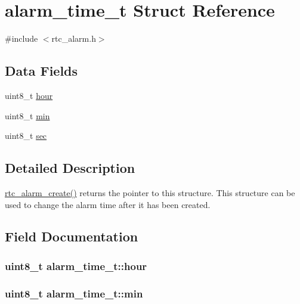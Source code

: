 \hypertarget{structalarm__time__t}{}\section{alarm\+\_\+time\+\_\+t Struct Reference}
\label{structalarm__time__t}


{\ttfamily \#include $<$rtc\+\_\+alarm.\+h$>$}

\subsection*{Data Fields}
\begin{DoxyCompactItemize}
\item 
uint8\+\_\+t \hyperlink{structalarm__time__t_a18062d8b9f04f5d358bfb5b9a98d3274}{hour}
\item 
uint8\+\_\+t \hyperlink{structalarm__time__t_acb0496766d834ee5c0e2cd243727f080}{min}
\item 
uint8\+\_\+t \hyperlink{structalarm__time__t_acee0c4e36d57b97fc128d666147961e6}{sec}
\end{DoxyCompactItemize}


\subsection{Detailed Description}
\hyperlink{rtc__alarm_8h_a887b55296bc21c983fa01dff378634ae}{rtc\+\_\+alarm\+\_\+create()} returns the pointer to this structure. This structure can be used to change the alarm time after it has been created. 

\subsection{Field Documentation}
\subsubsection[{\texorpdfstring{hour}{hour}}]{\setlength{\rightskip}{0pt plus 5cm}uint8\+\_\+t alarm\+\_\+time\+\_\+t\+::hour}\hypertarget{structalarm__time__t_a18062d8b9f04f5d358bfb5b9a98d3274}{}\label{structalarm__time__t_a18062d8b9f04f5d358bfb5b9a98d3274}
\subsubsection[{\texorpdfstring{min}{min}}]{\setlength{\rightskip}{0pt plus 5cm}uint8\+\_\+t alarm\+\_\+time\+\_\+t\+::min}\hypertarget{structalarm__time__t_acb0496766d834ee5c0e2cd243727f080}{}\label{structalarm__time__t_acb0496766d834ee5c0e2cd243727f080}
